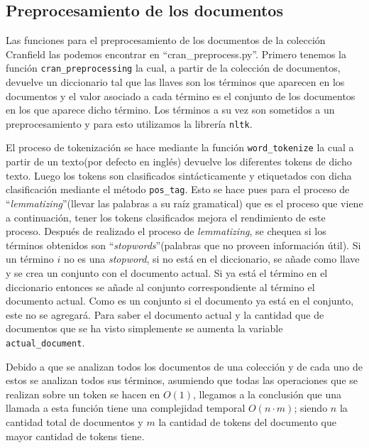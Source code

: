 \documentclass[runningheads]{llncs}
\begin{document}
	\subsection{Preprocesamiento de los documentos}
	
	Las funciones para el preprocesamiento de los documentos de la colecci\'on Cranfield las podemos encontrar en ``cran\_preprocess.py''. Primero tenemos la funci\'on \verb|cran_preprocessing| la cual, a partir de la colecci\'on de documentos, devuelve un diccionario tal que las llaves son los t\'erminos que aparecen en los documentos y el valor asociado a cada t\'ermino es el conjunto de los documentos en los que aparece dicho t\'ermino. Los t\'erminos a su vez son sometidos a un preprocesamiento y para esto utilizamos la librer\'ia \verb|nltk|.
	
	El proceso de tokenizaci\'on se hace mediante la funci\'on \verb|word_tokenize| la cual a partir de un texto(por defecto en ingl\'es) devuelve los diferentes tokens de dicho texto. Luego los tokens son clasificados sint\'acticamente y etiquetados con dicha clasificaci\'on mediante el m\'etodo \verb|pos_tag|. Esto se hace pues para el proceso de ``\textit{lemmatizing}''(llevar las palabras a su ra\'iz gramatical) que es el proceso que viene a continuaci\'on, tener los tokens clasificados mejora el rendimiento de este proceso. Despu\'es de realizado
	el proceso de \textit{lemmatizing}, se chequea si los t\'erminos obtenidos son ``\textit{stopwords}''(palabras que no proveen informaci\'on \'util). Si un t\'ermino $i$ no es una \textit{stopword}, si no est\'a en el diccionario, se a\~{n}ade como llave y se crea un conjunto con el documento actual. Si ya est\'a el t\'ermino en el diccionario entonces se a\~{n}ade al conjunto correspondiente al t\'ermino el documento actual. Como es un conjunto si el documento ya est\'a en el conjunto, este no se agregar\'a. Para saber el documento actual y la cantidad que de documentos que se ha visto simplemente se aumenta la variable \verb|actual_document|.
	
	Debido a que se analizan todos los documentos de una colecci\'on y de cada uno de estos se analizan todos sus t\'erminos, asumiendo que todas las operaciones que se realizan sobre un token se hacen en $O(1)$, llegamos a la conclusi\'on que una llamada a esta funci\'on tiene una complejidad temporal $O(n\cdot m)$; siendo $n$ la cantidad total de documentos y $m$ la cantidad de tokens del documento que mayor cantidad de tokens tiene.
	
\end{document}
